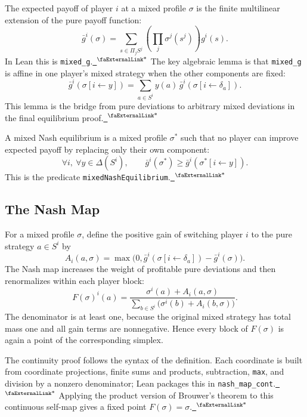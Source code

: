 \documentclass{article}
\theoremstyle{definition}
\newcommand{\extlink}{~\ensuremath{{}^\text{\faExternalLink*}}}
\begin{document}
The expected payoff of player $i$ at a mixed profile $\sigma$ is the finite multilinear extension of the pure payoff function:
$$
  \bar g^i(\sigma)
  = \sum_{s \in \Pi_j S^j}
      \left(\prod_j \sigma^j(s^j)\right) g^i(s).
$$
In Lean this is \texttt{mixed\_g}.\href{https://github.com/Solo-ary/Game-Theory-Formalization/blob/7b49d5267d4f26b17bdf071250880b63e96999b6/Brouwer/Gametheory/Nash.lean#L62}{\extlink}  The key algebraic lemma is that \texttt{mixed\_g} is affine in one player's mixed strategy when the other components are fixed:
$$
  \bar g^i(\sigma[i\leftarrow y])
  = \sum_{a\in S^i} y(a)\,\bar g^i(\sigma[i\leftarrow \delta_a]).
$$
This lemma is the bridge from pure deviations to arbitrary mixed deviations in the final equilibrium proof.\href{https://github.com/Solo-ary/Game-Theory-Formalization/blob/7b49d5267d4f26b17bdf071250880b63e96999b6/Brouwer/Gametheory/Nash.lean#L67-L134}{\extlink}

A mixed Nash equilibrium is a mixed profile $\sigma^*$ such that no player can improve expected payoff by replacing only their own component:
$$
  \forall i,\ \forall y\in\Delta(S^i),\qquad
  \bar g^i(\sigma^*) \geq \bar g^i(\sigma^*[i\leftarrow y]).
$$
This is the predicate \texttt{mixedNashEquilibrium}.\href{https://github.com/Solo-ary/Game-Theory-Formalization/blob/7b49d5267d4f26b17bdf071250880b63e96999b6/Brouwer/Gametheory/Nash.lean#L165-L167}{\extlink}

\subsection{The Nash Map}
For a mixed profile $\sigma$, define the positive gain of switching player $i$ to the pure strategy $a\in S^i$ by
$$
  A_i(a,\sigma)
  = \max\bigl(0,\bar g^i(\sigma[i\leftarrow\delta_a]) - \bar g^i(\sigma)\bigr).
$$
The Nash map increases the weight of profitable pure deviations and then renormalizes within each player block:
$$
  F(\sigma)^i(a)
  =
  \frac{\sigma^i(a)+A_i(a,\sigma)}
       {\sum_{b\in S^i}\bigl(\sigma^i(b)+A_i(b,\sigma)\bigr)}.
$$
The denominator is at least one, because the original mixed strategy has total mass one and all gain terms are nonnegative.  Hence every block of $F(\sigma)$ is again a point of the corresponding simplex.

The continuity proof follows the syntax of the definition.  Each coordinate is built from coordinate projections, finite sums and products, subtraction, \texttt{max}, and division by a nonzero denominator; Lean packages this in \texttt{nash\_map\_cont}.\href{https://github.com/Solo-ary/Game-Theory-Formalization/blob/7b49d5267d4f26b17bdf071250880b63e96999b6/Brouwer/Gametheory/Nash.lean#L401-L474}{\extlink}  Applying the product version of Brouwer's theorem to this continuous self-map gives a fixed point $F(\sigma)=\sigma$.\href{https://github.com/Solo-ary/Game-Theory-Formalization/blob/7b49d5267d4f26b17bdf071250880b63e96999b6/Brouwer/Gametheory/Nash.lean#L258-L343}{\extlink}
\end{document}
